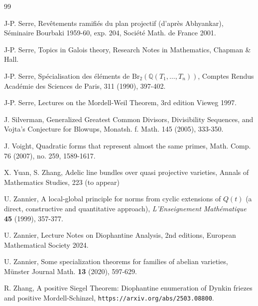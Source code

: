\documentclass[leqno,12pt]{article} %
\def\Q{{{\mathbb Q}}}
\theoremstyle{plain} %
\theoremstyle{definition} %
\begin{document}
\begin{thebibliography}{99}
 
  J-P. Serre, Rev\^etements ramifi\'es du plan projectif (d'apr\`es Abhyankar), S\'eminaire Bourbaki 1959-60, exp. 204, Soci\'et\'e Math. de France 2001.
\smallskip


 J-P. Serre, Topics in Galois theory, Research Notes in Mathematics, Chapman \& Hall.
 \smallskip

 J-P. Serre, Sp\'ecialisation des \'el\'ements   de   $\mathrm{Br}_2(\Q(T_1,\ldots,T_n))$,  Comptes Rendus Acad\'emie des Sciences de Paris, 311 (1990), 397-402. \smallskip

 J-P. Serre, Lectures on the Mordell-Weil Theorem, 3rd edition  Vieweg 1997. \smallskip

 J. Silverman, Generalized Greatest Common Divisors, Divisibility Sequences, and Vojta's Conjecture for Blowups, Monatsh. f. Math.  145 (2005),   333-350.

\smallskip



 J. Voight, Quadratic forms that represent almost the same primes,
Math. Comp. 76 (2007), no. 259, 1589-1617. \smallskip


 X. Yuan, S. Zhang, Adelic line bundles over quasi projective varieties, Annals of Mathematics Studies, 223 (to appear)


\smallskip

 
\smallskip

  U. Zannier, A local-global principle for norms from cyclic extensions of $Q(t)$ (a direct, constructive and quantitative approach), {\it L'Enseignement Math\'ematique} {\bf 45} (1999), 357-377.

\smallskip


 
 
    U. Zannier, Lecture Notes on Diophantine Analysis, 2nd editions, European Mathematical Society 2024. \smallskip
  
  
    U. Zannier, Some specialization theorems for families of
abelian varieties, M\"unster Journal Math. {\bf 13} (2020), 597-629. \smallskip

\smallskip


 R. Zhang, A positive Siegel Theorem: Diophantine enumeration of Dynkin friezes and positive Mordell-Schinzel, {\tt https://arxiv.org/abs/2503.08800}.



\end{thebibliography}
\bigskip
\end{document}
